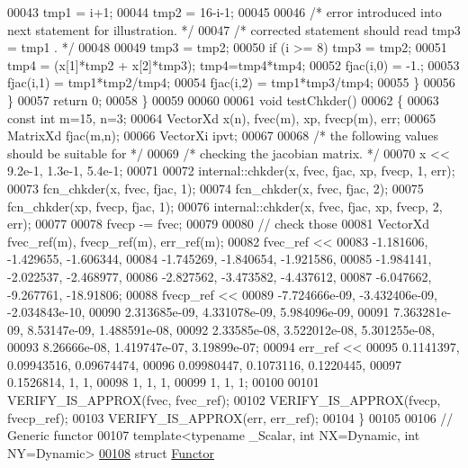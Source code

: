 \begin{DoxyCode}
00043             tmp1 = i+1;
00044             tmp2 = 16-i-1;
00045 
00046             \textcolor{comment}{/* error introduced into next statement for illustration. */}
00047             \textcolor{comment}{/* corrected statement should read    tmp3 = tmp1 . */}
00048 
00049             tmp3 = tmp2;
00050             \textcolor{keywordflow}{if} (i >= 8) tmp3 = tmp2;
00051             tmp4 = (x[1]*tmp2 + x[2]*tmp3); tmp4=tmp4*tmp4;
00052             fjac(i,0) = -1.;
00053             fjac(i,1) = tmp1*tmp2/tmp4;
00054             fjac(i,2) = tmp1*tmp3/tmp4;
00055         \}
00056     \}
00057     \textcolor{keywordflow}{return} 0;
00058 \}
00059 
00060 
00061 \textcolor{keywordtype}{void} testChkder()
00062 \{
00063   \textcolor{keyword}{const} \textcolor{keywordtype}{int} m=15, n=3;
00064   VectorXd x(n), fvec(m), xp, fvecp(m), err;
00065   MatrixXd fjac(m,n);
00066   VectorXi ipvt;
00067 
00068   \textcolor{comment}{/*      the following values should be suitable for */}
00069   \textcolor{comment}{/*      checking the jacobian matrix. */}
00070   x << 9.2e-1, 1.3e-1, 5.4e-1;
00071 
00072   internal::chkder(x, fvec, fjac, xp, fvecp, 1, err);
00073   fcn\_chkder(x, fvec, fjac, 1);
00074   fcn\_chkder(x, fvec, fjac, 2);
00075   fcn\_chkder(xp, fvecp, fjac, 1);
00076   internal::chkder(x, fvec, fjac, xp, fvecp, 2, err);
00077 
00078   fvecp -= fvec;
00079 
00080   \textcolor{comment}{// check those}
00081   VectorXd fvec\_ref(m), fvecp\_ref(m), err\_ref(m);
00082   fvec\_ref <<
00083       -1.181606, -1.429655, -1.606344,
00084       -1.745269, -1.840654, -1.921586,
00085       -1.984141, -2.022537, -2.468977,
00086       -2.827562, -3.473582, -4.437612,
00087       -6.047662, -9.267761, -18.91806;
00088   fvecp\_ref <<
00089       -7.724666e-09, -3.432406e-09, -2.034843e-10,
00090       2.313685e-09,  4.331078e-09,  5.984096e-09,
00091       7.363281e-09,   8.53147e-09,  1.488591e-08,
00092       2.33585e-08,  3.522012e-08,  5.301255e-08,
00093       8.26666e-08,  1.419747e-07,   3.19899e-07;
00094   err\_ref <<
00095       0.1141397,  0.09943516,  0.09674474,
00096       0.09980447,  0.1073116, 0.1220445,
00097       0.1526814, 1, 1,
00098       1, 1, 1,
00099       1, 1, 1;
00100 
00101   VERIFY\_IS\_APPROX(fvec, fvec\_ref);
00102   VERIFY\_IS\_APPROX(fvecp, fvecp\_ref);
00103   VERIFY\_IS\_APPROX(err, err\_ref);
00104 \}
00105 
00106 \textcolor{comment}{// Generic functor}
00107 \textcolor{keyword}{template}<\textcolor{keyword}{typename} \_Scalar, \textcolor{keywordtype}{int} NX=Dynamic, \textcolor{keywordtype}{int} NY=Dynamic>
\hyperlink{struct_functor}{00108} \textcolor{keyword}{struct }\hyperlink{struct_functor}{Functor}

\end{DoxyCode}
